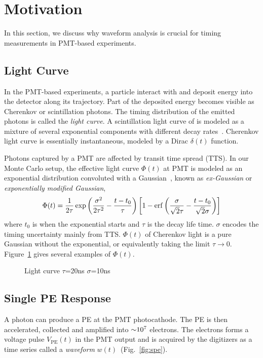 \section{Motivation} %
\label{sec:toyMC}

In this section, we discuss why waveform analysis is crucial for timing measurements in PMT-based experiments. 

\subsection{Light Curve}
In the PMT-based experiments, a particle interact with and deposit energy into the detector along its trajectory. Part of the deposited energy becomes visible as Cherenkov or scintillation photons.  The timing distribution of the emitted photons is called the \textit{light curve}.  A scintillation light curve of is modeled as a mixture of several exponential components with different decay rates~\cite{ludhova_particle_2020}.  Cherenkov light curve is essentially instantaneous, modeled by a Dirac $\delta(t)$ function.

Photons captured by a PMT are affected by transit time spread (TTS).  In our Monte Carlo setup, the effective light curve $\Phi(t)$ at PMT is modeled as an exponential distribution convoluted with a Gaussian~\cite{li_separation_2016}, known as \textit{ex-Gaussian} or \textit{exponentially modified Gaussian},
\begin{align}
    \Phi(t) = \frac{1}{2\tau} \exp\left(\frac{\sigma^2}{2\tau^2}-\frac{t-t_0}{\tau}\right) \left[1 - \operatorname{erf}\left( \frac{\sigma}{\sqrt{2}\tau} - \frac{t-t_0}{\sqrt{2}\sigma} \right)\right]
    \label{eq:time-pro}
\end{align}
where $t_0$ is when the exponential starts and $\tau$ is the decay life time.  $\sigma$ encodes the timing uncertainty mainly from TTS.  $\Phi(t)$ of Cherenkov light is a pure Gaussian without the exponential, or equivalently taking the limit $\tau \rightarrow 0$.  Figure~\ref{fig:time-pro} gives several examples of $\Phi(t)$.

\begin{figure}
  \centering
  \resizebox{0.6\textwidth}{!}{}
  \caption{\label{fig:time-pro} Light curve $\tau$=20ns $\sigma$=10ns}
\end{figure}

\subsection{Single PE Response}
A photon can produce a PE at the PMT photocathode.  The PE is then accelerated, collected and amplified into $\num[retain-unity-mantissa=false]{\sim 1e7}$ electrons.  The electrons forms a voltage pulse $V_\mathrm{PE}(t)$ in the PMT output and is acquired by the digitizers as a time series called a \textit{waveform} $w(t)$~(Fig.~\ref{fig:spe}).

